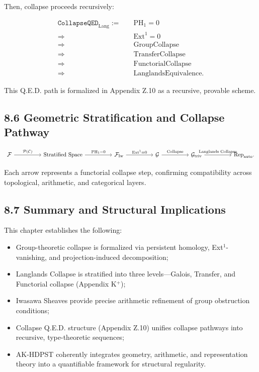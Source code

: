 \documentclass[11pt]{article}
\begin{document}
Then, collapse proceeds recursively:

\[
\begin{aligned}
\texttt{CollapseQED}_{\mathrm{Lang}} :=\quad
& \mathrm{PH}_1 = 0 \\
\Rightarrow\ & \mathrm{Ext}^1 = 0 \\
\Rightarrow\ & \text{GroupCollapse} \\
\Rightarrow\ & \text{TransferCollapse} \\
\Rightarrow\ & \text{FunctorialCollapse} \\
\Rightarrow\ & \text{LanglandsEquivalence}.
\end{aligned}
\]


This Q.E.D. path is formalized in Appendix Z.10 as a recursive, provable scheme.

\subsection*{8.6 Geometric Stratification and Collapse Pathway}

\[
\begin{tikzcd}[column sep=huge]
\mathcal{F} \arrow[r, "\mathcal{P}(\mathcal{C})"]
& \text{Stratified Space} \arrow[r, "\mathrm{PH}_1 = 0"]
& \mathcal{F}_{\mathrm{Iw}} \arrow[r, "\mathrm{Ext}^1 = 0"]
& \mathcal{G} \arrow[r, "\text{Collapse}"]
& \mathcal{G}_{\mathrm{triv}} \arrow[r, "\text{Langlands Collapse}"]
& \mathrm{Rep}_{\mathrm{auto}}.
\end{tikzcd}
\]

Each arrow represents a functorial collapse step, confirming compatibility across topological, arithmetic, and categorical layers.

\subsection*{8.7 Summary and Structural Implications}

This chapter establishes the following:

\begin{itemize}
    \item Group-theoretic collapse is formalized via persistent homology, Ext$^1$-vanishing, and projection-induced decomposition;
    \item Langlands Collapse is stratified into three levels—Galois, Transfer, and Functorial collapse (Appendix K$^+$);
    \item Iwasawa Sheaves provide precise arithmetic refinement of group obstruction conditions;
    \item Collapse Q.E.D. structure (Appendix Z.10) unifies collapse pathways into recursive, type-theoretic sequences;
    \item AK-HDPST coherently integrates geometry, arithmetic, and representation theory into a quantifiable framework for structural regularity.
\end{itemize}
\end{document}
